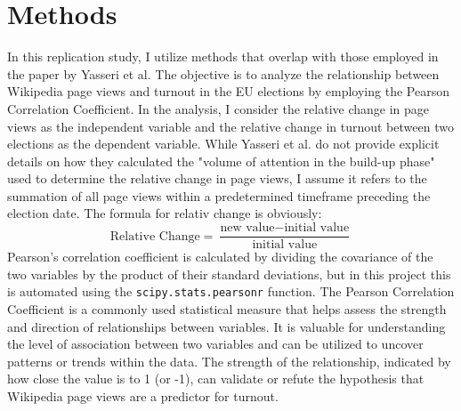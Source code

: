 \chapter{Methods}
\label{sec:methods}

In this replication study, I utilize methods that overlap with those employed in the paper by Yasseri et al. The objective is to analyze the relationship between Wikipedia page views and turnout in the EU elections by employing the Pearson Correlation Coefficient. In the analysis, I consider the relative change in page views as the independent variable and the relative change in turnout between two elections as the dependent variable. While Yasseri et al. do not provide explicit details on how they calculated the "volume of attention in the build-up phase" used to determine the relative change in page views, I assume it refers to the summation of all page views within a predetermined timeframe preceding the election date. The formula for relativ change is obviously:$$
\text{{Relative Change}} = \frac{{\text{{new value}} - \text{{initial value}}}}{{\text{{initial value}}}}
$$
Pearson's correlation coefficient is calculated by dividing the covariance of the two variables by the product of their standard deviations, but in this project this is automated using the \texttt{scipy.stats.pearsonr} function. The Pearson Correlation Coefficient is a commonly used statistical measure that helps assess the strength and direction of relationships between variables. It is valuable for understanding the level of association between two variables and can be utilized to uncover patterns or trends within the data. The strength of the relationship, indicated by how close the value is to 1 (or -1), can validate or refute the hypothesis that Wikipedia page views are a predictor for turnout.